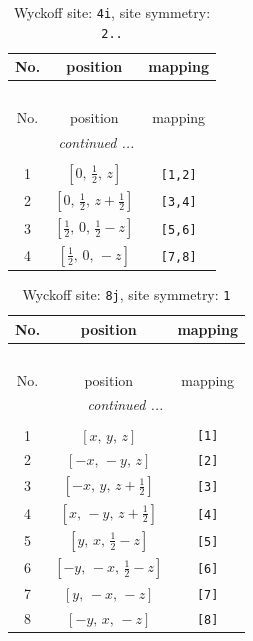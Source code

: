 \documentclass[fleqn,8pt]{jsarticle}
\begin{document}
\renewcommand{\arraystretch}{1.2}
\begin{longtable}{ccc}
\caption{Wyckoff site: {\tt 4i}, site symmetry: {\tt 2..}}
 \\
 \hline \hline
No. & position & mapping \\ \hline \endfirsthead

\multicolumn{2}{l}{\tablename\ \thetable{}} \\
 \hline \hline
No. & position & mapping \\ \hline \endhead

 \hline \hline
\multicolumn{2}{r}{\footnotesize\it continued ...} \\ \endfoot

 \hline \hline
\multicolumn{2}{r}{} \\ \endlastfoot

1 & $\left[ 0,\, \frac{1}{2},\, z \right]$ & {\tt [1,2]} \\ \hline
2 & $\left[ 0,\, \frac{1}{2},\, z + \frac{1}{2} \right]$ & {\tt [3,4]} \\ \hline
3 & $\left[ \frac{1}{2},\, 0,\, \frac{1}{2} - z \right]$ & {\tt [5,6]} \\ \hline
4 & $\left[ \frac{1}{2},\, 0,\, - z \right]$ & {\tt [7,8]} \\
\end{longtable}
\renewcommand{\arraystretch}{1.2}
\begin{longtable}{ccc}
\caption{Wyckoff site: {\tt 8j}, site symmetry: {\tt 1}}
 \\
 \hline \hline
No. & position & mapping \\ \hline \endfirsthead

\multicolumn{2}{l}{\tablename\ \thetable{}} \\
 \hline \hline
No. & position & mapping \\ \hline \endhead

 \hline \hline
\multicolumn{2}{r}{\footnotesize\it continued ...} \\ \endfoot

 \hline \hline
\multicolumn{2}{r}{} \\ \endlastfoot

1 & $\left[ x,\, y,\, z \right]$ & {\tt [1]} \\ \hline
2 & $\left[ - x,\, - y,\, z \right]$ & {\tt [2]} \\ \hline
3 & $\left[ - x,\, y,\, z + \frac{1}{2} \right]$ & {\tt [3]} \\ \hline
4 & $\left[ x,\, - y,\, z + \frac{1}{2} \right]$ & {\tt [4]} \\ \hline
5 & $\left[ y,\, x,\, \frac{1}{2} - z \right]$ & {\tt [5]} \\ \hline
6 & $\left[ - y,\, - x,\, \frac{1}{2} - z \right]$ & {\tt [6]} \\ \hline
7 & $\left[ y,\, - x,\, - z \right]$ & {\tt [7]} \\ \hline
8 & $\left[ - y,\, x,\, - z \right]$ & {\tt [8]} \\
\end{longtable}
\end{document}
